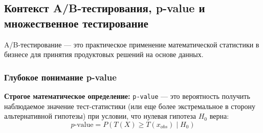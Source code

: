 \documentclass[12pt]{article}
\begin{document}
\newpage

\subsection{Контекст A/B-тестирования, p-value и множественное тестирование}

A/B-тестирование --- это практическое применение математической статистики в бизнесе для принятия продуктовых решений на основе данных.

\subsubsection{Глубокое понимание p-value}

\textbf{Строгое математическое определение:}
\texttt{p-value} --- это вероятность получить наблюдаемое значение тест-статистики (или еще более экстремальное в сторону альтернативной гипотезы) при условии, что нулевая гипотеза $H_0$ верна:
\begin{equation}
    p\text{-value} = P(T(X) \ge T(x_{obs}) \mid H_0)
\end{equation}
\end{document}
